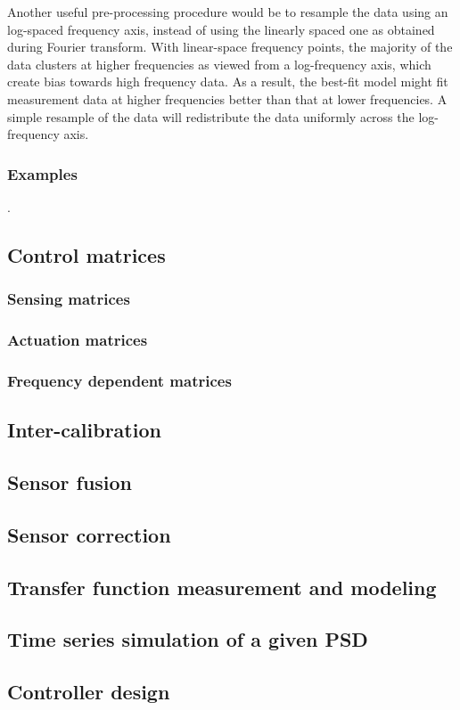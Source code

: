 Another useful pre-processing procedure would be to resample the data using an log-spaced frequency axis, instead of using the linearly spaced one as obtained during Fourier transform.
With linear-space frequency points, the majority of the data clusters at higher frequencies as viewed from a log-frequency axis, which create bias towards high frequency data.
As a result, the best-fit model might fit measurement data at higher frequencies better than that at lower frequencies.
A simple resample of the data will redistribute the data uniformly across the log-frequency axis.

\subsubsection{Examples \label{sec:curve_fitting_examples}}
.
\subsection{Control matrices}
\subsubsection{Sensing matrices}
\subsubsection{Actuation matrices}
\subsubsection{Frequency dependent matrices}
\subsection{Inter-calibration}
\subsection{Sensor fusion}
\subsection{Sensor correction}
\subsection{Transfer function measurement and modeling}
\subsection{Time series simulation of a given PSD}
\subsection{Controller design}

